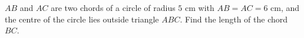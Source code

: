 $AB$ and $AC$ are two chords of a circle of radius $5$ cm with $AB=AC=6$ cm, and the centre of the circle lies outside triangle $ABC$. Find the length of the chord $BC$.
